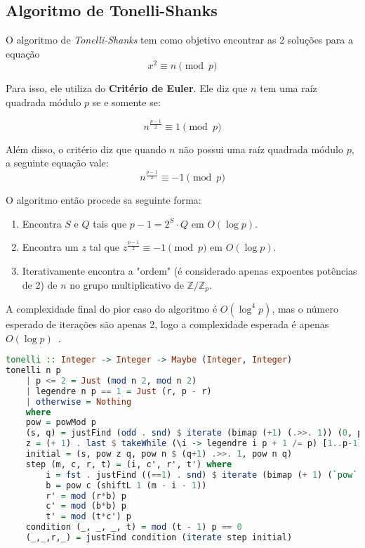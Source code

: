 \documentclass{article}
\begin{document}
\subsection{Algoritmo de Tonelli-Shanks}
\label{tonelliShanks}

O algoritmo de \textit{Tonelli-Shanks} tem como objetivo encontrar as 2 soluções para a equação
\begin{equation}
    x^2 \equiv n \pmod{p}
\end{equation}

Para isso, ele utiliza do \textbf{Critério de Euler}. Ele diz que $n$ tem uma raíz quadrada módulo $p$ se e somente se:

\begin{equation}
    n^{\frac{p-1}{2}} \equiv 1 \pmod{p}
\end{equation}

Além disso, o critério diz que quando $n$ não possui uma raíz quadrada módulo $p$, a seguinte equação vale:
\begin{equation}
    n^{\frac{p-1}{2}} \equiv -1 \pmod{p}
\end{equation}

O algoritmo então procede sa seguinte forma:
\begin{enumerate}
    \item Encontra $S$ e $Q$ tais que $p-1 = 2^S \cdot Q$ em $O(\log p)$.
    \item Encontra um $z$ tal que $z^{\frac{p-1}{2}} \equiv -1 \pmod{p}$ em $O(\log p)$.
    \item Iterativamente encontra a "ordem" (é considerado apenas expoentes potências de 2) de $n$ no grupo multiplicativo de $\mathbb{Z} / \mathbb{Z}_p$.
\end{enumerate}

A complexidade final do pior caso do algoritmo é $O(\log^4 p)$, mas o número esperado de iterações são apenas 2, logo a complexidade esperada é apenas $O(\log p)$~\cite{Koo_Jo_Kwon_2013}.

\begin{minipage}{.9\linewidth}
\begin{lstlisting}[language=haskell,caption=Tonelli-Shanks]
tonelli :: Integer -> Integer -> Maybe (Integer, Integer)
tonelli n p
    | p <= 2 = Just (mod n 2, mod n 2)
    | legendre n p == 1 = Just (r, p - r)
    | otherwise = Nothing
    where
    pow = powMod p
    (s, q) = justFind (odd . snd) $ iterate (bimap (+1) (.>>. 1)) (0, p-1)
    z = (+ 1) . last $ takeWhile (\i -> legendre i p + 1 /= p) [1..p-1]
    initial = (s, pow z q, pow n $ (q+1) .>>. 1, pow n q)
    step (m, c, r, t) = (i, c', r', t') where
        i = fst . justFind ((==1) . snd) $ iterate (bimap (+ 1) (`pow` 2)) (0, t)
        b = pow c (shiftL 1 (m - i - 1))
        r' = mod (r*b) p
        c' = mod (b*b) p
        t' = mod (t*c') p
    condition (_, _, _, t) = mod (t - 1) p == 0
    (_,_,r,_) = justFind condition (iterate step initial)

\end{lstlisting}
\end{minipage}
\end{document}
